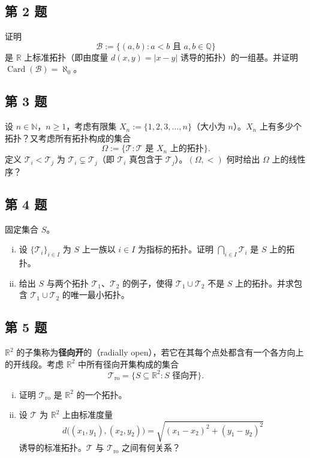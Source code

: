 \documentclass[11pt,a4paper]{article}
\newcommand{\R}{\mathbb{R}}
\newcommand{\Q}{\mathbb{Q}}
\newcommand{\N}{\mathbb{N}}
\theoremstyle{definition}
\begin{document}
\subsection{第 2 题}

证明
\[
  \mathcal{B} := \{(a, b) : a < b \text{ 且 } a, b \in \Q\}
\]
是 $\R$ 上标准拓扑（即由度量 $d(x, y) = |x - y|$ 诱导的拓扑）的一组基。并证明 $\operatorname{Card}(\mathcal{B}) = \aleph_0$。

\subsection{第 3 题}

设 $n \in \N$，$n \ge 1$，考虑有限集 $X_n := \{1, 2, 3, \dots, n\}$（大小为 $n$）。$X_n$ 上有多少个拓扑？又考虑所有拓扑构成的集合
\[
  \Omega := \{\mathcal{T} : \mathcal{T} \text{ 是 } X_n \text{ 上的拓扑}\}.
\]
定义 $\mathcal{T}_i < \mathcal{T}_j$ 为 $\mathcal{T}_i \subsetneq \mathcal{T}_j$（即 $\mathcal{T}_i$ 真包含于 $\mathcal{T}_j$）。$(\Omega, <)$ 何时给出 $\Omega$ 上的线性序？

\subsection{第 4 题}

固定集合 $S$。
\begin{enumerate}[(i)]
  \item 设 $\{\mathcal{T}_i\}_{i \in I}$ 为 $S$ 上一族以 $i \in I$ 为指标的拓扑。证明 $\bigcap_{i \in I} \mathcal{T}_i$ 是 $S$ 上的拓扑。
  \item 给出 $S$ 与两个拓扑 $\mathcal{T}_1$、$\mathcal{T}_2$ 的例子，使得 $\mathcal{T}_1 \cup \mathcal{T}_2$ 不是 $S$ 上的拓扑。并求包含 $\mathcal{T}_1 \cup \mathcal{T}_2$ 的唯一最小拓扑。
\end{enumerate}

\subsection{第 5 题}

$\R^2$ 的子集称为\textbf{径向开}的（radially open），若它在其每个点处都含有一个各方向上的开线段。考虑 $\R^2$ 中所有径向开集构成的集合
\[
  \mathcal{T}_{\mathrm{ro}} = \{S \subseteq \R^2 : S \text{ 径向开}\}.
\]
\begin{enumerate}[(i)]
  \item 证明 $\mathcal{T}_{\mathrm{ro}}$ 是 $\R^2$ 的一个拓扑。
  \item 设 $\mathcal{T}$ 为 $\R^2$ 上由标准度量
    \[
      d\bigl((x_1, y_1), (x_2, y_2)\bigr) = \sqrt{(x_1 - x_2)^2 + (y_1 - y_2)^2}
    \]
    诱导的标准拓扑。$\mathcal{T}$ 与 $\mathcal{T}_{\mathrm{ro}}$ 之间有何关系？
\end{enumerate}
\end{document}
